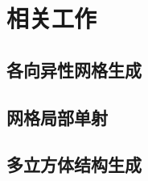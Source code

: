 ﻿\chapter{相关工作} \label{chap:related}

\section{各向异性网格生成}\label{sec:LCT_related}


\section{网格局部单射}


\section{多立方体结构生成}


